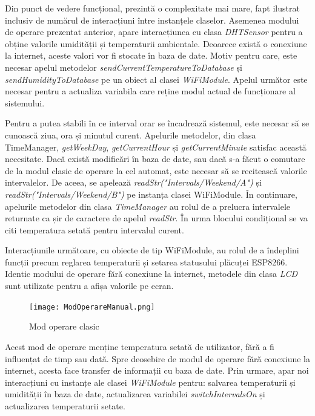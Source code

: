 	Din punct de vedere funcțional, prezintă o complexitate mai mare, fapt ilustrat inclusiv de numărul de interacțiuni între instanțele claselor. Asemenea modului de operare prezentat anterior, apare interacțiunea cu clasa \textit{DHTSensor} pentru a obține valorile umidității și temperaturii ambientale. Deoarece există o conexiune la internet, aceste valori vor fi stocate în baza de date. Motiv pentru care, este necesar apelul metodelor \textit{sendCurrentTemperatureToDatabase} și \textit{sendHumidityToDatabase} pe un obiect al clasei \textit{WiFiModule}. Apelul următor este necesar pentru a actualiza variabila care reține modul actual de funcționare al sistemului. 

	Pentru a putea stabili în ce interval orar se încadrează sistemul, este necesar să se cunoască ziua, ora și minutul curent. Apelurile metodelor, din clasa TimeManager, \textit{getWeekDay}, \textit{getCurrentHour} și \textit{getCurrentMinute} satisfac această necesitate. Dacă există modificări în baza de date, sau dacă s-a făcut o comutare de la modul clasic de operare la cel automat, este necesar să se recitească valorile intervalelor. De aceea, se apelează \textit{readStr("Intervals/Weekend/A")} și \textit{readStr("Intervals/Weekend/B")} pe instanța clasei WiFiModule. În continuare, apelurile metodelor din clasa \textit{TimeManager} au rolul de a prelucra intervalele returnate ca șir de caractere de apelul \textit{readStr}. În urma blocului condițional se va citi temperatura setată pentru intervalul curent.

	Interacțiunile următoare, cu obiecte de tip WiFiModule, au rolul de a îndeplini funcții precum reglarea temperaturii și setarea statusului plăcuței ESP8266. Identic modului de operare fără conexiune la internet, metodele din clasa \textit{LCD} sunt utilizate pentru a afișa valorile pe ecran. 

\begin{figure}[H]
   	\centering
    	\texttt{[image: ModOperareManual.png]}
	\caption{Mod operare clasic}
\end{figure}

	Acest mod de operare menține temperatura setată de utilizator, fără a fi influențat de timp sau dată. Spre deosebire de modul de operare fără conexiune la internet, acesta face transfer de informații cu baza de date. Prin urmare, apar noi interacțiuni cu instanțe ale clasei \textit{WiFiModule} pentru: salvarea temperaturii și umidității în baza de date, actualizarea variabilei \textit{switchIntervalsOn} și actualizarea temperaturii setate.


